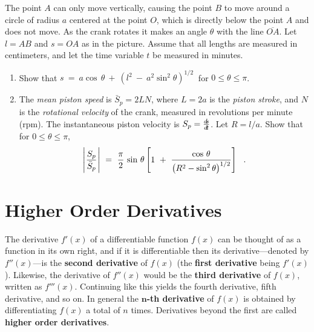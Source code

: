 {\begin{enumerate}[\bfseries 1.]
The point $A$ can only move vertically, causing the point $B$ to move around a circle
of radius $a$ centered at the point $O$, which is directly below the point $A$ and
does not move. As the crank rotates it makes an
angle $\theta$ with the line $\overline{OA}$. Let $l = AB$ and $s = OA$ as in
the picture. Assume that all lengths are measured in centimeters, and let the time
variable $t$ be measured in minutes.
 \begin{enumerate}[\bfseries (a)]
  \item Show that $s ~=~ a \cos\,\theta ~+~ \left(l^2 ~-~ a^2 \sin^2\theta\right)^{1/2}~$
  for $0 \le \theta \le \pi$.
  \item The \emph{mean piston speed} is $\bar{S}_p = 2LN$, where $L = 2a$ is the
   \emph{piston stroke}, and $N$ is the \emph{rotational velocity} of
   the crank, measured in revolutions per minute (rpm). The instantaneous piston velocity
   is $S_p = \frac{d\negmedspace s}{d\!t}$. Let $R = l/a$. Show that for $0 \le \theta \le \pi$,
\begin{displaymath}
 \Biggl\lvert\mspace{1mu}\frac{S_p}{\bar{S}_p}\mspace{1mu}\Biggr\rvert ~=~ \frac{\pi}{2}\,\sin\,\theta
 \left[1 ~+~ \frac{\cos\,\theta}{\left(R^2 - \sin^2\theta\right)^{1/2}}\right] ~~.
\end{displaymath}
 \end{enumerate}
\end{enumerate}}
\newpage
\section{Higher Order Derivatives}
The derivative $f'(x)$ of a differentiable function $f(x)$ can be thought of as
a function in its own right, and if it is differentiable then its
derivative---denoted by $f''(x)$---is the
\textbf{second derivative} of $f(x)$ (the
\textbf{first derivative} being $f'(x)$). Likewise, the
derivative of $f''(x)$ would be the \textbf{third derivative} of $f(x)$, written
as $f'''(x)$. Continuing like this yields the fourth derivative, fifth
derivative, and so on. In general the
\textbf{$\bm{n}$-th derivative} of $f(x)$ is
obtained by differentiating $f(x)$ a total of $n$ times. Derivatives beyond the
first are called \textbf{higher order derivatives}.

